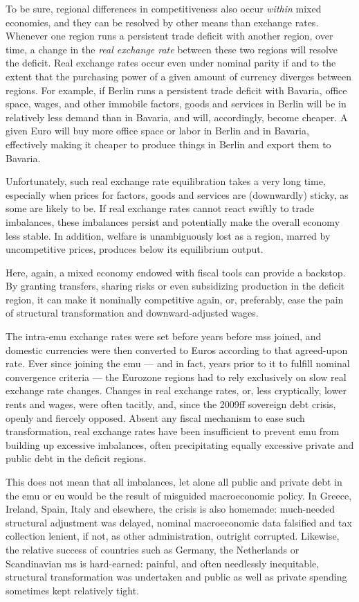 To be sure, regional differences in competitiveness also occur \emph{within} mixed economies, and they can be resolved by other means than exchange rates.
Whenever one region runs a persistent trade deficit with another region, over time, a change in the \emph{real exchange rate} between these two regions will resolve the deficit.
Real exchange rates occur even under nominal parity if and to the extent that the purchasing power of a given amount of currency diverges between regions.
For example, if Berlin runs a persistent trade deficit with Bavaria, office space, wages, and other immobile factors, goods and services in Berlin will be in relatively less demand than in Bavaria, and will, accordingly, become cheaper.
A given Euro will buy more office space or labor in Berlin and in Bavaria, effectively making it cheaper to produce things in Berlin and export them to Bavaria.

Unfortunately, such real exchange rate equilibration takes a very long time, especially when prices for factors, goods and services are (downwardly) sticky, as some are likely to be.
If real exchange rates cannot react swiftly to trade imbalances, these imbalances persist and potentially make the overall economy less stable.
In addition, welfare is unambiguously lost as a region, marred by uncompetitive prices, produces below its equilibrium output.

Here, again, a mixed economy endowed with fiscal tools can provide a backstop.
By granting transfers, sharing risks or even subsidizing production in the deficit region, it can make it nominally competitive again, or, preferably, ease the pain of structural transformation and downward-adjusted wages.

The intra-\gls{emu} exchange rates were set before years before \glspl{ms} joined, and domestic currencies were then converted to Euros according to that agreed-upon rate.
Ever since joining the \gls{emu} --- and in fact, years prior to it to fulfill nominal convergence criteria --- the Eurozone regions had to rely exclusively on slow real exchange rate changes.
Changes in real exchange rates, or, less cryptically, lower rents and wages, were often tacitly, and, since the 2009ff sovereign debt crisis, openly and fiercely opposed.
Absent any fiscal mechanism to ease such transformation, real exchange rates have been insufficient to prevent \gls{emu} from building up excessive imbalances, often precipitating equally excessive private and public debt in the deficit regions.

This does not mean that all imbalances, let alone all public and private debt in the \gls{emu} or \gls{eu} would be the result of misguided macroeconomic policy.
In Greece, Ireland, Spain, Italy and elsewhere, the crisis is also homemade:
much-needed structural adjustment was delayed, nominal macroeconomic data falsified and tax collection lenient, if not, as other administration, outright corrupted.
Likewise, the relative success of countries such as Germany, the Netherlands or Scandinavian \gls{ms} is hard-earned:
painful, and often needlessly inequitable, structural transformation was undertaken and public as well as private spending sometimes kept relatively tight.


